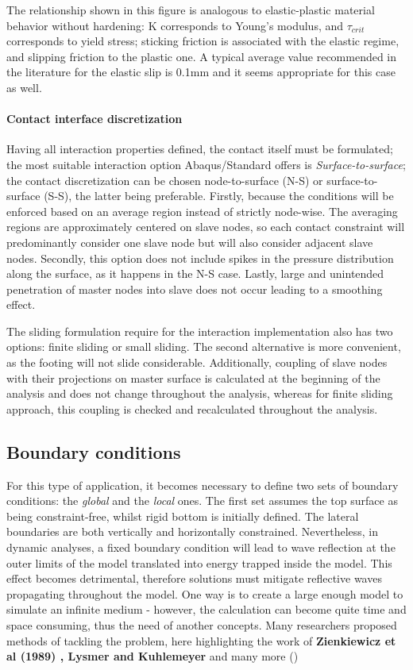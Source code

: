 The relationship shown in this figure is analogous to elastic-plastic material behavior without hardening: K corresponds to Young's modulus, and $\tau_{crit}$ corresponds to yield stress; sticking friction is associated with the elastic regime, and slipping friction to the plastic one. A typical average value recommended in the literature for the elastic slip is 0.1mm and it seems appropriate for this case as well.

\paragraph{Contact interface discretization}
Having all interaction properties defined, the contact itself must be formulated; the most suitable interaction option Abaqus/Standard offers is \textit{Surface-to-surface}; the contact discretization can be chosen node-to-surface (N-S) or surface-to-surface (S-S), the latter being preferable. Firstly, because the conditions will be enforced based on an average region instead of strictly node-wise. The averaging regions are approximately centered on slave nodes, so each contact constraint will predominantly consider one slave node but will also consider adjacent slave nodes. Secondly, this option does not include spikes in the pressure distribution along the surface, as it happens in the N-S case. Lastly, large and unintended penetration of master nodes into slave does not occur leading to a smoothing effect.

The sliding formulation require for the interaction implementation also has two options: finite sliding or small sliding. The second alternative is more convenient, as the footing will not slide considerable. Additionally, coupling of slave nodes with their projections on master surface
is calculated at the beginning of the analysis and does not change throughout the analysis,
whereas for finite sliding approach, this coupling is checked and recalculated throughout the
analysis.

\subsection{Boundary conditions}
For this type of application, it becomes necessary to define two sets of boundary conditions: the \textit{global} and the \textit{local} ones. The first set assumes the top surface as being constraint-free, whilst rigid bottom is initially defined. The lateral boundaries are both vertically and horizontally constrained.
Nevertheless, in dynamic analyses, a fixed boundary condition will lead to wave reflection at the outer limits of the model translated into energy trapped inside the model. This effect becomes detrimental, therefore solutions must mitigate reflective waves propagating throughout the model. One way is to create a large enough model to simulate an infinite medium - however, the calculation can become quite time and space consuming, thus the need of another concepts. Many researchers proposed methods of tackling the problem, here highlighting the work of  \textbf{Zienkiewicz et al (1989) \cite{zienkiewicz1989earthquake}, Lysmer and Kuhlemeyer} \cite{zienkiewicz1989earthquake} and many more ()

